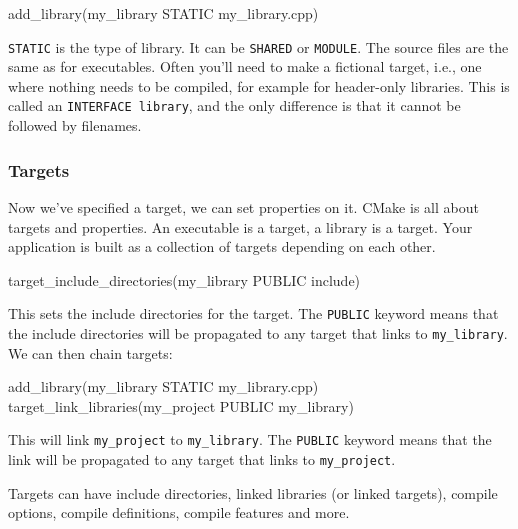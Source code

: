 \begin{codeblock}[language=bash]
add_library(my_library STATIC my_library.cpp)
\end{codeblock}

\texttt{STATIC} is the type of library. It can be \texttt{SHARED} or \texttt{MODULE}. The source files are the same as for executables.
Often you'll need to make a fictional target, i.e., one where nothing needs to be compiled, for example for header-only libraries. This is called an \texttt{INTERFACE library},
and the only difference is that it cannot be followed by filenames.

\subsubsection{Targets}

Now we've specified a target, we can set properties on it.
CMake is all about targets and properties. An executable is a target, a library is a target. Your
application is built as a collection of targets depending on each other.


\begin{codeblock}[language=bash]
target_include_directories(my_library PUBLIC include)
\end{codeblock}

This sets the include directories for the target. The \texttt{PUBLIC} keyword means that the include directories will be propagated to any target that links to \texttt{my\_library}.
We can then chain targets:

\begin{codeblock}[language=bash]
add_library(my_library STATIC my_library.cpp)
target_link_libraries(my_project PUBLIC my_library)
\end{codeblock}

This will link \texttt{my\_project} to \texttt{my\_library}. The \texttt{PUBLIC} keyword means that the link will be propagated to any target that links to \texttt{my\_project}.

Targets can have include directories, linked libraries (or linked targets), compile options, compile definitions, 
compile features and more.

